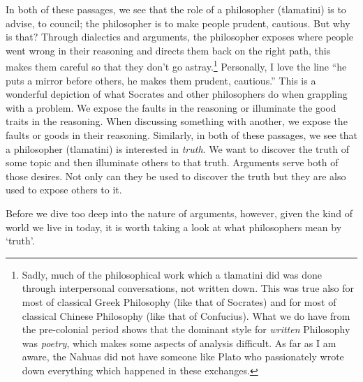 In both of these passages, we see that the role of a philosopher (tlamatini) is to advise, to council; the philosopher is to make people prudent, cautious. But why is that? Through dialectics and arguments, the philosopher exposes where people went wrong in their reasoning and directs them back on the right path, this makes them careful so that they don't go astray.\footnote{Sadly, much of the philosophical work which a tlamatini did was done through interpersonal conversations, not written down. This was true also for most of classical Greek Philosophy (like that of Socrates) and for most of classical Chinese Philosophy (like that of Confucius). What we do have from the pre-colonial period shows that the dominant style for \emph{written} Philosophy was \emph{poetry}, which makes some aspects of analysis difficult.\autocite[p. 36-37]{McLeod1}  As far as I am aware, the Nahuas did not have someone like Plato who passionately wrote down everything which happened in these exchanges.} Personally, I love the line ``he puts a mirror before others, he makes them prudent, cautious.'' This is a wonderful depiction of what Socrates and other philosophers do when grappling with a problem. We expose the faults in the reasoning or illuminate the good traits in the reasoning. When discussing something with another, we expose the faults or goods in their reasoning. Similarly, in both of these passages, we see that a philosopher (tlamatini) is interested in \emph{truth}. We want to discover the truth of some topic and then illuminate others to that truth. Arguments serve both of those desires. Not only can they be used to discover the truth but they are also used to expose others to it. 

Before we dive too deep into the nature of arguments, however, given the kind of world we live in today, it is worth taking a look at what philosophers mean by `truth'.

